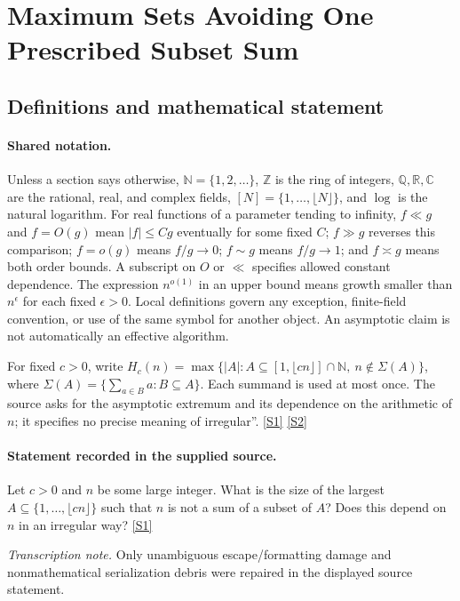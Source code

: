 \documentclass[11pt,a4paper]{article}
\newcommand{\N}{\mathbb{N}}
\newcommand{\Z}{\mathbb{Z}}
\newcommand{\Q}{\mathbb{Q}}
\newcommand{\R}{\mathbb{R}}
\newcommand{\C}{\mathbb{C}}
\newcommand{\sref}[2]{\hyperlink{source:#1:#2}{[S#2]}}
\begin{document}
\section{Maximum Sets Avoiding One Prescribed Subset Sum}\label{statement}


\subsection{Definitions and mathematical statement}

\paragraph{Shared notation.}Unless a section says otherwise, $\N=\{1,2,\ldots\}$,
$\Z$ is the ring of integers, $\Q,\R,\C$ are the rational, real, and complex
fields, $[N]=\{1,\ldots,\lfloor N\rfloor\}$, and $\log$ is the natural
logarithm. For real functions of a parameter tending to infinity,
$f\ll g$ and $f=O(g)$ mean $|f|\leq Cg$ eventually for some fixed $C$;
$f\gg g$ reverses this comparison; $f=o(g)$ means $f/g\to0$;
$f\sim g$ means $f/g\to1$; and $f\asymp g$ means both order bounds.
A subscript on $O$ or $\ll$ specifies allowed constant dependence.
The expression $n^{o(1)}$ in an upper bound means growth smaller than
$n^\epsilon$ for each fixed $\epsilon>0$. Local definitions govern any
exception, finite-field convention, or use of the same symbol for another
object. An asymptotic claim is not automatically an effective algorithm.



For fixed $c>0$, write $H_c(n)=\max\{|A|:A\subseteq[1,\lfloor cn\rfloor]\cap\N,\ n\notin\Sigma(A)\}$, where $\Sigma(A)=\{\sum_{a\in B}a:B\subseteq A\}$. Each summand is used at most once. The source asks for the asymptotic extremum and its dependence on the arithmetic of $n$; it specifies no precise meaning of irregular''. \sref{statement}{1} \sref{statement}{2}

\paragraph{Statement recorded in the supplied source.}
Let $c>0$ and $n$ be some large integer. What is the size of the largest $A\subseteq \{1,\ldots,\lfloor cn\rfloor\}$ such that $n$ is not a sum of a subset of $A$? Does this depend on $n$ in an irregular way? \sref{statement}{1}

{\small\emph{Transcription note.} Only unambiguous escape/formatting damage and nonmathematical serialization debris were repaired in the displayed source statement.}
\end{document}
